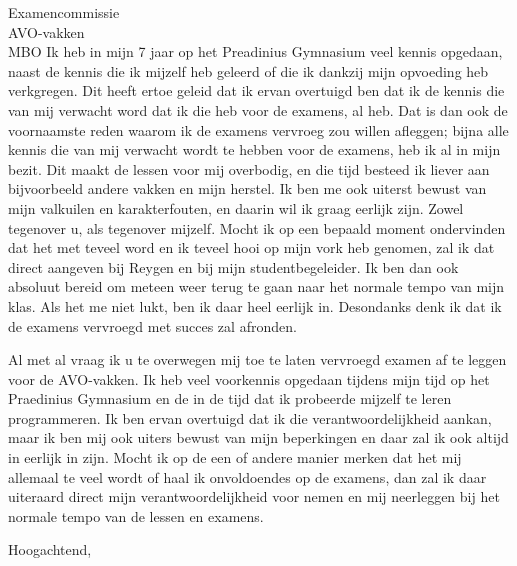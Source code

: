 \documentclass{letter}
\begin{document}
\begin{letter}{Examencommissie \\ AVO-vakken \\ MBO}
Ik heb in mijn 7 jaar op het Preadinius Gymnasium veel kennis opgedaan, naast de kennis die ik mijzelf
heb geleerd of die ik dankzij mijn opvoeding heb verkgregen. Dit heeft ertoe geleid dat ik ervan 
overtuigd ben dat ik de kennis die van mij verwacht word dat ik die heb voor de examens, al heb.
Dat is dan ook de voornaamste reden waarom ik de examens vervroeg zou willen afleggen; bijna alle
kennis die van mij verwacht wordt te hebben voor de examens, heb ik al in mijn bezit. Dit maakt 
de lessen voor mij overbodig, en die tijd besteed ik liever aan bijvoorbeeld andere vakken en mijn herstel. 
Ik ben me ook uiterst bewust van mijn valkuilen en karakterfouten,
en daarin wil ik graag eerlijk zijn. Zowel tegenover u, als tegenover mijzelf. Mocht ik op een bepaald
moment ondervinden dat het met teveel word en ik teveel hooi op mijn vork heb genomen, zal ik dat direct
aangeven bij Reygen en bij mijn studentbegeleider. Ik ben dan ook absoluut bereid om meteen weer
terug te gaan naar het normale tempo van mijn klas. Als het me niet lukt, ben ik daar heel eerlijk in.
Desondanks denk ik dat ik de examens vervroegd met succes zal afronden.


Al met al vraag ik u te overwegen mij toe te laten vervroegd examen af te leggen voor de AVO-vakken. Ik heb veel voorkennis
opgedaan tijdens mijn tijd op het Praedinius Gymnasium en de in de tijd dat ik probeerde mijzelf te leren programmeren.
Ik ben ervan overtuigd dat ik die verantwoordelijkheid aankan, maar ik ben mij ook uiters bewust
van mijn beperkingen en daar zal ik ook altijd in eerlijk in zijn. Mocht ik op de een of andere manier merken 
dat het mij allemaal te veel wordt of haal ik onvoldoendes op de examens, dan zal ik daar uiteraard direct 
mijn verantwoordelijkheid voor nemen en mij neerleggen bij het normale tempo van de lessen en examens.
\closing{Hoogachtend,}

\end{letter}
\end{document}
